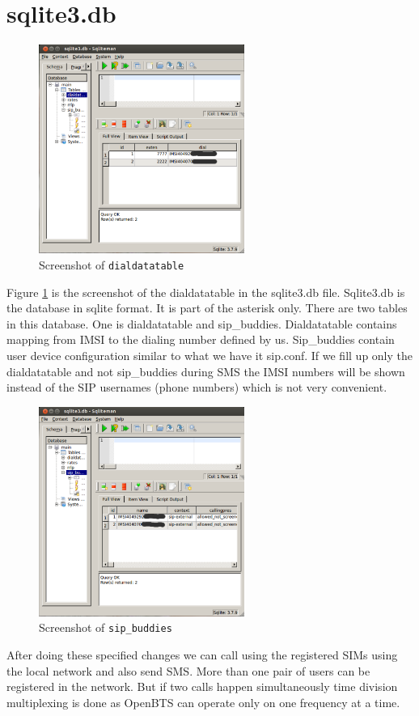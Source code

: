 \section{sqlite3.db}

\begin{figure}
  \centering
    \includegraphics[width=0.6\textwidth]{../images/dialdata}
  \caption[Screenshot - dialdatatable]{Screenshot of \texttt{dialdatatable}}
  \label{dialdata}
\end{figure}


Figure \ref{dialdata} is the screenshot of the dialdatatable in the sqlite3.db file. Sqlite3.db is 
the database in sqlite format. It is part of the asterisk only. There are two
tables in this database. One is dialdatatable and sip\_buddies. 
Dialdatatable contains mapping from IMSI  to the dialing number defined by us.
Sip\_buddies contain user device configuration similar to what we have it 
sip.conf. If we fill up only the dialdatatable and not sip\_buddies during SMS
the IMSI numbers will be shown instead of the SIP usernames (phone numbers)
which is not very convenient.

\begin{figure}
  \centering
    \includegraphics[width=0.6\textwidth]{../images/sipbuddies}
  \caption[Screenshot - sip\_buddies]{Screenshot of \texttt{sip\_buddies}}
  \label{sipbuddies}
\end{figure}

After doing these specified changes we can call using the registered SIMs
using the local network and also send SMS. More than one pair of users can be
registered in the network. But if two calls happen simultaneously time
division multiplexing is done as OpenBTS can operate only on one frequency
at a time. 
